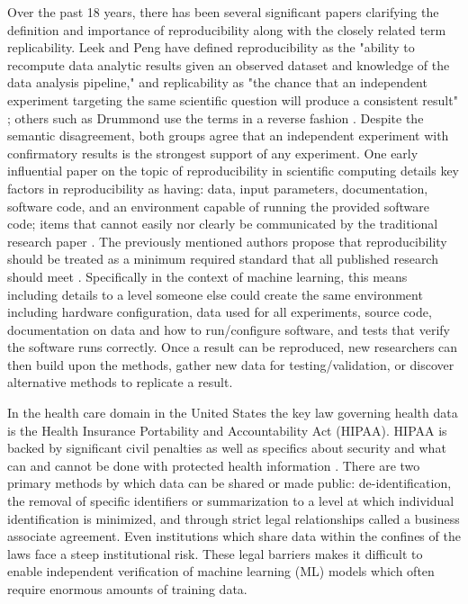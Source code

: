 \documentclass{article}
\begin{document}
 Over the past 18 years, there has been several significant papers clarifying the definition and importance of reproducibility along with the closely related term replicability. Leek and Peng have defined reproducibility as the "ability to recompute data analytic results given an observed dataset and knowledge of the data analysis pipeline," and replicability as "the chance that an independent experiment targeting the same scientific question will produce a consistent result" \cite{leek_opinion_2015}; others such as Drummond use the terms in a reverse fashion \cite{drummond_replicability_2009}. Despite the semantic disagreement, both groups agree that an independent experiment with confirmatory results is the strongest support of any experiment. One early influential paper on the topic of reproducibility in scientific computing details key factors in reproducibility as having: data, input parameters, documentation, software code, and an environment capable of running the provided software code; items that cannot easily nor clearly be communicated by the traditional research paper \cite{schwab_making_2000}. The previously mentioned authors propose that reproducibility should be treated as a minimum required standard that all published research should meet \cite{peng_reproducible_2006}. Specifically in the context of machine learning, this means including details to a level someone else could create the same environment including hardware configuration, data used for all experiments, source code, documentation on data and how to run/configure software, and tests that verify the software runs correctly. Once a result can be reproduced, new researchers can then build upon the methods, gather new data for testing/validation, or discover alternative methods to replicate a result.

In the health care domain in the United States the key law governing health data is the Health Insurance Portability and Accountability Act (HIPAA). HIPAA is backed by significant civil penalties as well as specifics about security and what can and cannot be done with protected health information \cite{hippaviol}. There are two primary methods by which data can be shared or made public: de-identification, the removal of specific identifiers or summarization to a level at which individual identification is minimized, and through strict legal relationships called a business associate agreement. Even institutions which share data within the confines of the laws face a steep institutional risk. These legal barriers makes it difficult to enable independent verification of machine learning (ML) models which often require enormous amounts of training data.
\end{document}
